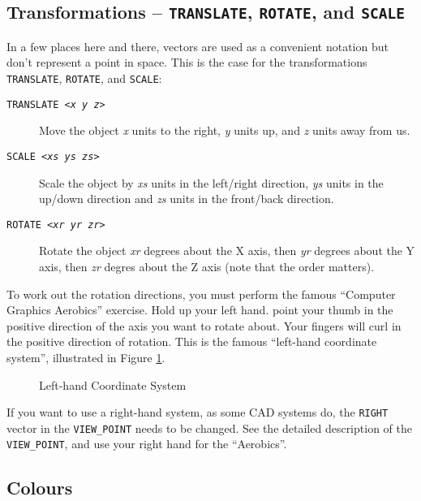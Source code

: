 \subsection{Transformations -- {\tt TRANSLATE}, {\tt ROTATE}, and {\tt SCALE}}

In a few places here and there, vectors are used as a convenient notation but
don't represent a point in space. This is the case for the transformations
{\tt TRANSLATE}, {\tt ROTATE}, and {\tt SCALE}:

\begin{description}
\item[{\tt TRANSLATE <{\em x y z\/}>}] Move the object {\em x} units
to the right, {\em y} units up, and {\em z} units away from us.
\item[{\tt SCALE <{\em xs ys zs\/}>}] Scale the object by {\em xs}
units in the left/right direction, {\em ys} units in the up/down
direction and {\em zs} units in the front/back direction.
\item[{\tt ROTATE <{\em xr yr zr\/}>}] Rotate the object {\em xr}
degrees about the X axis, then {\em yr} degrees about the Y axis,
then {\em zr} degres about the Z axis (note that the order matters).
\end{description}

To work out the rotation directions, you must perform the famous ``Computer
Graphics Aerobics'' exercise.  Hold up your left hand.
point your thumb in the
positive direction of the axis you want to rotate about.  Your fingers will
curl in the positive direction of rotation.  This is the famous ``left-hand
coordinate system'', illustrated in Figure \ref{lefthand}.
\begin{figure}[htbp]
\begin{centering}

\caption{Left-hand Coordinate System}
\label{lefthand}
\end{centering}
\end{figure}
If you want to use a right-hand system, as some CAD
systems do, the {\tt RIGHT} vector in the {\tt VIEW_POINT} needs to
be changed.  See the
detailed description of the {\tt VIEW_POINT}, and use your right hand for the
``Aerobics''. 

\subsection{Colours}

